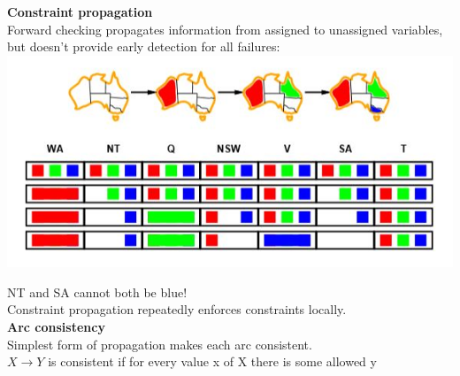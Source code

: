 \textbf{Constraint propagation}\\
Forward checking propagates information from assigned to unassigned variables, but doesn’t provide early detection for all failures: \\
\includegraphics[scale=1]{chap1_pics/backtrack4.jpeg}

NT and SA cannot both be blue!\\
Constraint propagation repeatedly enforces constraints locally.\\

\textbf{Arc consistency}\\
Simplest form of propagation makes each arc consistent.\\
$X \rightarrow  Y$ is consistent if for every value x of X there is some allowed y \\